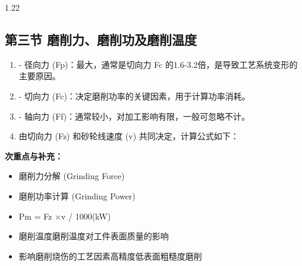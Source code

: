 \documentclass[12pt,a4paper]{article}
\begin{document}
\begin{spacing}{1.22}
\subsection{第三节 磨削力、磨削功及磨削温度}
\begin{tcolorbox}[colback=yellow!6,colframe=red!55!black,title=重点,left=1mm,right=1mm]
\begin{enumerate}[leftmargin=2.2em,label=\arabic*.]
  \item - 径向力 (Fp)：最大，通常是切向力 Fc 的1.6-3.2倍，是导致工艺系统变形的主要原因。
  \item - 切向力 (Fc)：决定磨削功率的关键因素，用于计算功率消耗。
  \item - 轴向力 (Ff)：通常较小，对加工影响有限，一般可忽略不计。
  \item 由切向力 (Fz) 和砂轮线速度 (v) 共同决定，计算公式如下：
\end{enumerate}
\end{tcolorbox}
\noindent\textbf{次重点与补充：}
\begin{itemize}[leftmargin=2.2em,label=--]
  \item 磨削力分解 (Grinding Force)
  \item 磨削功率计算 (Grinding Power)
  \item Pm = Fz ×v / 1000(kW)
  \item 磨削温度磨削温度对工件表面质量的影响
  \item 影响磨削烧伤的工艺因素高精度低表面粗糙度磨削
\end{itemize}


\end{spacing}
\end{document}
